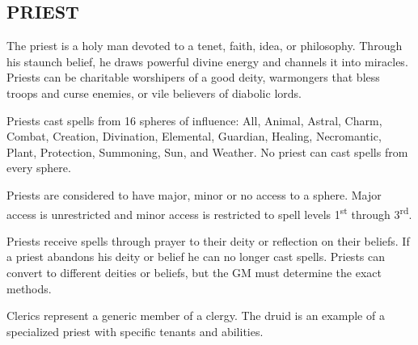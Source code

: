 \begin{multicols}{2}
\section{PRIEST}

The priest is a holy man devoted to a tenet, faith, idea, or philosophy.  Through his staunch belief, he draws powerful divine energy and channels it into miracles.  Priests can be charitable worshipers of a good deity, warmongers that bless troops and curse enemies, or vile believers of diabolic lords.  

Priests cast spells from 16 spheres of influence: All, Animal, Astral, Charm, Combat, Creation, Divination, Elemental, Guardian, Healing, Necromantic, Plant, Protection, Summoning, Sun, and Weather.  No priest can cast spells from every sphere.

Priests are considered to have major, minor or no access to a sphere.  Major access is unrestricted and minor access is restricted to spell levels 1\textsuperscript{st} through 3\textsuperscript{rd}.

Priests receive spells through prayer to their deity or reflection on their beliefs.  If a priest abandons his deity or belief he can no longer cast spells.  Priests can convert to different deities or beliefs, but the GM must determine the exact methods.

Clerics represent a generic member of a clergy.  The druid is an example of a specialized priest with specific tenants and abilities. 

\end{multicols}

